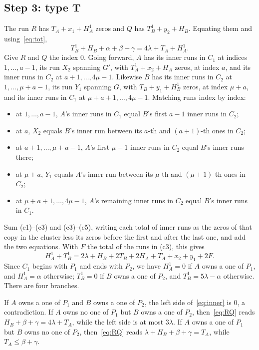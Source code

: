 \documentclass[12pt]{article}
\begin{document}
\subsection{Step 3: type T}
The run $R$ has $T_A + x_1 + H^1_A$ zeros and $Q$ has $T^1_B + y_2 + H_B$. Equating them and
using~\eqref{eq:tot},
\begin{equation}\label{eq:RQ}
T^1_B + H_B + \alpha + \beta + \gamma = 4\lambda + T_A + H^1_A .
\end{equation}
Give $R$ and $Q$ the index $0$. Going forward, $A$ has its inner runs in $C_1$ at indices $1, \dots, a-1$, its
run $X_2$ spanning $G'$, with $T^1_A + x_2 + H_A$ zeros, at index $a$, and its inner runs in $C_2$ at
$a+1, \dots, 4\mu-1$. Likewise $B$ has its inner runs in $C_2$ at $1, \dots, \mu+a-1$, its run $Y_1$ spanning
$G$, with $T_B + y_1 + H^1_B$ zeros, at index $\mu+a$, and its inner runs in $C_1$ at
$\mu+a+1, \dots, 4\mu-1$. Matching runs index by index:
\begin{itemize}
\item[(c1)] at $1, \dots, a-1$, $A$'s inner runs in $C_1$ equal $B$'s first $a-1$ inner runs in $C_2$;
\item[(c2)] at $a$, $X_2$ equals $B$'s inner run between its $a$-th and $(a+1)$-th ones in $C_2$;
\item[(c3)] at $a+1, \dots, \mu+a-1$, $A$'s first $\mu-1$ inner runs in $C_2$ equal $B$'s inner runs there;
\item[(c4)] at $\mu+a$, $Y_1$ equals $A$'s inner run between its $\mu$-th and $(\mu+1)$-th ones in $C_2$;
\item[(c5)] at $\mu+a+1, \dots, 4\mu-1$, $A$'s remaining inner runs in $C_2$ equal $B$'s inner runs in $C_1$.
\end{itemize}
Sum (c1)--(c3) and (c3)--(c5), writing each total of inner runs as the zeros of that copy in the cluster less
its zeros before the first and after the last one, and add the two equations. With $F$ the total of the runs
in (c3), this gives
\begin{equation}\label{eq:inner}
H^1_A + T^1_B = 2\lambda + H_B + 2T_B + 2H_A + T_A + x_2 + y_1 + 2F .
\end{equation}
Since $C_1$ begins with $P_1$ and ends with $P_2$, we have $H^1_A = 0$ if $A$ owns a one of $P_1$, and
$H^1_A = \alpha$ otherwise; $T^1_B = 0$ if $B$ owns a one of $P_2$, and $T^1_B = 5\lambda - \alpha$ otherwise.
There are four branches.

If $A$ owns a one of $P_1$ and $B$ owns a one of $P_2$, the left side of~\eqref{eq:inner} is $0$, a
contradiction. If $A$ owns no one of $P_1$ but $B$ owns a one of $P_2$, then~\eqref{eq:RQ} reads $H_B + \beta
+ \gamma = 4\lambda + T_A$, while the left side is at most $3\lambda$. If $A$ owns a one of $P_1$ but $B$ owns no
one of $P_2$, then~\eqref{eq:RQ} reads $\lambda + H_B + \beta + \gamma = T_A$, while $T_A \le \beta + \gamma$.
\end{document}
